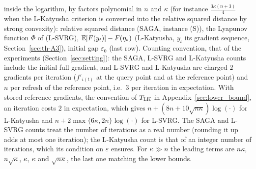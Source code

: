 \begin{table}[t]
{inside the logarithm, by factors polynomial in $n$ and $\kappa$ (for instance $\frac{3\kappa(n+3)}4$ when the L-Katyusha
criterion is converted into the relative squared distance by strong convexity): relative squared distance (SAGA,
instance (S)), the Lyapunov function $\Phi$ of \cite[Theorem~5]{kovalev2020dont} (L-SVRG), $\mathbb{E}[F(y_t)]-F(\eta_\ast)$
(L-Katyusha, $y_t$ its gradient sequence, Section~\ref{sec:th-A3}), initial gap $\varepsilon_0$ (last row). Counting convention, that of the experiments
(Section~\ref{sec:setting}): the SAGA, L-SVRG and L-Katyusha counts include the initial full gradient, and L-SVRG and
L-Katyusha are charged $2$ gradients per iteration ($f'_{i(t)}$ at the query point and at the reference point) and $n$
per refresh of the reference point, i.e.\ $3$ per iteration in expectation. With stored reference gradients, the
convention of $T_{\rm LK}$ in Appendix~\ref{sec:lower_bound}, an iteration costs $2$ in expectation, which gives
$n+(8n+10\sqrt{n\kappa})\log(\cdot)$ for L-Katyusha and $n+2\max\{6\kappa,2n\}\log(\cdot)$ for L-SVRG. The SAGA and
L-SVRG counts treat the number of iterations as a real number (rounding it up adds at most one iteration); the
L-Katyusha count is that of an integer number of iterations, which its condition on $\varepsilon$ ensures. For
$\kappa\gg n$ the leading terms are $n\kappa$, $n\sqrt\kappa$, $\kappa$, $\kappa$ and $\sqrt{n\kappa}$, the last one
matching the lower bounds.}
\label{tab:th-complexity}
\end{table}
